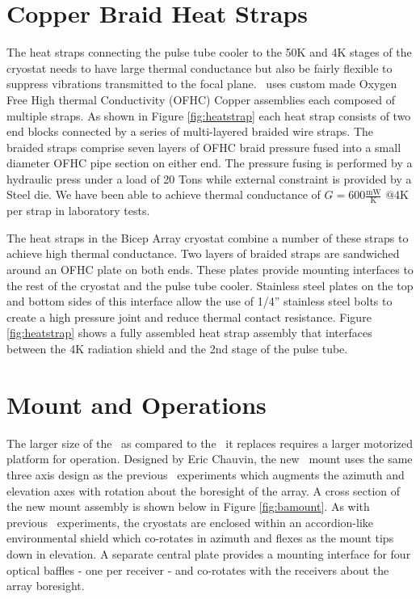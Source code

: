 \documentclass[]{spie}  %
\begin{document}
\section{Copper Braid Heat Straps}

The heat straps connecting the pulse tube cooler to the 50K and 4K stages of
the cryostat needs to have large thermal conductance but also be fairly
flexible to suppress vibrations transmitted to the focal plane. \biceparray \ 
uses custom made Oxygen Free High thermal Conductivity (OFHC) Copper
assemblies each composed of multiple straps. As shown
in Figure \ref{fig:heatstrap} each heat strap consists of two end blocks
connected by a series of multi-layered braided wire straps. The braided straps
comprise seven layers of OFHC braid pressure fused into a small diameter OFHC
pipe section on either end. The pressure fusing is performed by a hydraulic
press under a load of 20 Tons while external constraint is provided by a Steel
die. We have been able to achieve thermal conductance of $G=600
\frac{\text{mW}}{\text{K}} \text{  @}4\text{K}$ per strap in laboratory tests.

The heat straps in the Bicep Array cryostat combine a number of these straps
to achieve high thermal conductance. Two layers of braided straps are
sandwiched around an OFHC plate on both ends. These plates provide mounting
interfaces to the rest of the cryostat and the pulse tube cooler. Stainless
steel plates on the top and bottom sides of this interface allow the use of
1/4'' stainless steel bolts to create a high pressure joint and reduce thermal
contact resistance. Figure \ref{fig:heatstrap} shows a fully assembled heat
strap assembly that interfaces between the 4K radiation shield and the 2nd
stage of the pulse tube.




\section{Mount and Operations}

The larger size of the \biceparray \ as compared to the \keckarray \ it replaces
requires a larger motorized platform for operation. Designed by Eric Chauvin,
the new \biceparray \ mount uses the same three axis design as the previous
\bk \ experiments which augments the azimuth and elevation axes with
rotation about the boresight of the array. A
cross section of the new mount assembly is shown below in Figure
\ref{fig:bamount}. As with previous \bk \ experiments, the cryostats
are enclosed within an accordion-like environmental shield which co-rotates in
azimuth and flexes as the mount tips down in elevation. A separate central
plate provides a mounting interface for four optical baffles - one per
receiver - and co-rotates with the receivers about the array boresight.
\end{document}
